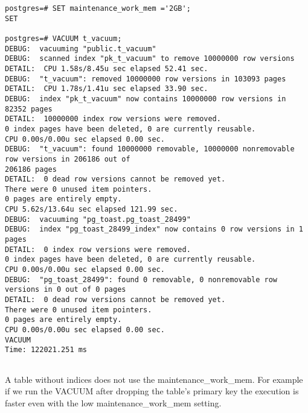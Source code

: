 \begin{lstlisting}[style=pgsql]
postgres=# SET maintenance_work_mem ='2GB';
SET

postgres=# VACUUM t_vacuum;
DEBUG:  vacuuming "public.t_vacuum"
DEBUG:  scanned index "pk_t_vacuum" to remove 10000000 row versions
DETAIL:  CPU 1.58s/8.45u sec elapsed 52.41 sec.
DEBUG:  "t_vacuum": removed 10000000 row versions in 103093 pages
DETAIL:  CPU 1.78s/1.41u sec elapsed 33.90 sec.
DEBUG:  index "pk_t_vacuum" now contains 10000000 row versions in 82352 pages
DETAIL:  10000000 index row versions were removed.
0 index pages have been deleted, 0 are currently reusable.
CPU 0.00s/0.00u sec elapsed 0.00 sec.
DEBUG:  "t_vacuum": found 10000000 removable, 10000000 nonremovable row versions in 206186 out of 
206186 pages
DETAIL:  0 dead row versions cannot be removed yet.
There were 0 unused item pointers.
0 pages are entirely empty.
CPU 5.62s/13.64u sec elapsed 121.99 sec.
DEBUG:  vacuuming "pg_toast.pg_toast_28499"
DEBUG:  index "pg_toast_28499_index" now contains 0 row versions in 1 pages
DETAIL:  0 index row versions were removed.
0 index pages have been deleted, 0 are currently reusable.
CPU 0.00s/0.00u sec elapsed 0.00 sec.
DEBUG:  "pg_toast_28499": found 0 removable, 0 nonremovable row versions in 0 out of 0 pages
DETAIL:  0 dead row versions cannot be removed yet.
There were 0 unused item pointers.
0 pages are entirely empty.
CPU 0.00s/0.00u sec elapsed 0.00 sec.
VACUUM
Time: 122021.251 ms


\end{lstlisting}

A table without indices does not use the maintenance\_work\_mem. For example if we run 
the VACUUM after dropping the table's primary key the execution is faster even with the low 
maintenance\_work\_mem setting.\newline

